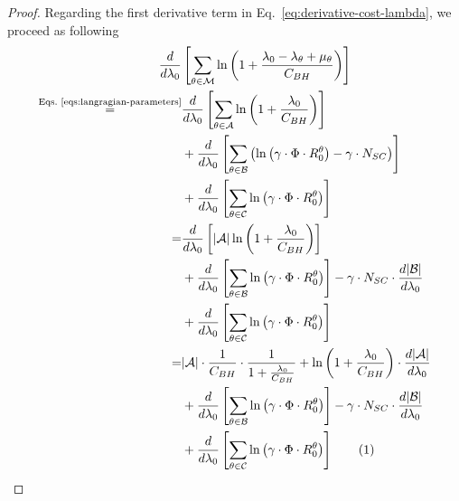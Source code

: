 \documentclass[10pt,conference,letterpaper]{IEEEtran}
\newcommand{\eq}[1]{Eq.~\eqref{#1}}
\newcommand{\eqs}[1]{Eqs.~\eqref{#1}}
\newcommand\numberthis{\addtocounter{equation}{1}\tag{\theequation}}
\begin{document}
\begin{proof}
Regarding the first derivative term in \eq{eq:derivative-cost-lambda}, we proceed as following
\begin{align*}\label{eq:derivative-sum-1}
\frac{d}{d\lambda_{0}}&\left[\sum_{\theta\in\mathcal{M}}\ln\left(1+\frac{\lambda_{0}-\lambda_{\theta}+\mu_{\theta}}{C_{BH}} \right ) \right ] \\
\stackrel{\text{\eqs{eqs:langragian-parameters}}}{=} 
	&\frac{d}{d\lambda_{0}}\left[\sum_{\theta\in\mathcal{A}}\ln\left(1+\frac{\lambda_{0}}{C_{BH}} \right) \right]\\ 
	&+ \frac{d}{d\lambda_{0}}\left[\sum_{\theta\in\mathcal{B}}\left(\ln\left(\gamma\cdot\Phi\cdot R_{0}^{\theta} \right)-\gamma\cdot N_{SC}\right)\right]\\
	&+ \frac{d}{d\lambda_{0}}\left[\sum_{\theta\in\mathcal{C}}\ln\left(\gamma\cdot\Phi\cdot R_{0}^{\theta} \right) \right]\\
=
&\frac{d}{d\lambda_{0}}\left[|\mathcal{A}|\ln\left(1+\frac{\lambda_{0}}{C_{BH}}\right) \right]\\
&+ \frac{d}{d\lambda_{0}}\left[\sum_{\theta\in\mathcal{B}}\ln\left(\gamma\cdot\Phi\cdot R_{0}^{\theta} \right) \right]-\gamma\cdot N_{SC}\cdot \frac{d|\mathcal{B}|}{d\lambda_{0}}\\
&+ \frac{d}{d\lambda_{0}}\left[\sum_{\theta\in\mathcal{C}}\ln\left(\gamma\cdot\Phi\cdot R_{0}^{\theta} \right) \right]\\
=
&|\mathcal{A}|\cdot \frac{1}{C_{BH}}\cdot \frac{1}{1+\frac{\lambda_{0}}{C_{BH}}}+\ln\left(1+\frac{\lambda_{0}}{C_{BH}}\right)\cdot \frac{d|\mathcal{A}|}{d\lambda_{0}}\\
&+ \frac{d}{d\lambda_{0}}\left[\sum_{\theta\in\mathcal{B}}\ln\left(\gamma\cdot\Phi\cdot R_{0}^{\theta} \right) \right]-\gamma\cdot N_{SC}\cdot \frac{d|\mathcal{B}|}{d\lambda_{0}}\\
&+ \frac{d}{d\lambda_{0}}\left[\sum_{\theta\in\mathcal{C}}\ln\left(\gamma\cdot\Phi\cdot R_{0}^{\theta} \right) \right] \numberthis
\end{align*}


\end{proof}
\end{document}
